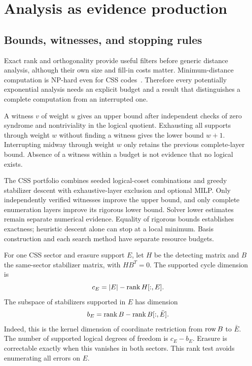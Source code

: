 \section{Analysis as evidence production}

\subsection{Bounds, witnesses, and stopping rules}
Exact rank and orthogonality provide useful filters before generic
distance analysis, although their own size and fill-in costs matter. Minimum-distance computation is NP-hard even for CSS
codes~\cite{kapshikar2023}. Therefore every potentially exponential
analysis needs an explicit budget and a result that distinguishes a
complete computation from an interrupted one.

A witness $v$ of weight $u$ gives an upper bound after independent checks
of zero syndrome and nontriviality in the logical quotient. Exhausting
all supports through weight $w$ without finding a witness gives the lower
bound $w+1$. Interrupting midway through weight $w$ only retains the
previous complete-layer bound. Absence of a witness within a budget is
not evidence that no logical exists.

The CSS portfolio combines seeded logical-coset combinations and greedy
stabilizer descent with exhaustive-layer exclusion and optional MILP.
Only independently verified witnesses improve the upper bound, and only
complete enumeration layers improve its rigorous lower bound. Solver lower
estimates remain separate numerical evidence. Equality of rigorous bounds
establishes exactness; heuristic descent alone can stop at a local minimum.
Basis construction and each search method have separate resource budgets.

For one CSS sector and erasure support $E$, let $H$ be the detecting
matrix and $B$ the same-sector stabilizer matrix, with $HB^T=0$. The
supported cycle dimension is
\begin{equation}
 c_E=|E|-\operatorname{rank} H[:,E].
\end{equation}
The subspace of stabilizers supported in $E$ has dimension
\begin{equation}
 b_E=\operatorname{rank} B-\operatorname{rank} B[:,\bar E].
\end{equation}
Indeed, this is the kernel dimension of coordinate restriction from
$\operatorname{row} B$ to $\bar E$. The number of supported logical degrees of freedom
is $c_E-b_E$. Erasure is correctable exactly when this vanishes in both
sectors. This rank test avoids enumerating all errors on $E$.

